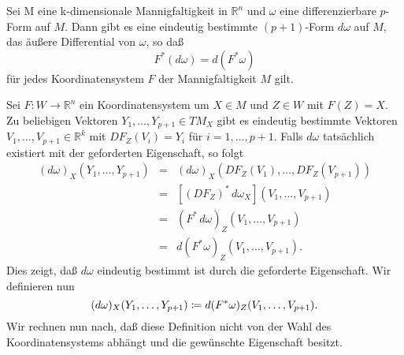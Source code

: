 \documentclass[a4paper,twoside,DIV15,BCOR12mm]{scrbook}
\begin{document}
\bigskip

\begin{satz}\label{Satz3.6.5.} {Sei M eine k-dimensionale 
Mannigfaltigkeit in ${\mathbb R}^{n}$ und $\omega$ eine 
differenzierbare $p$-Form auf $M$. Dann gibt es eine eindeutig bestimmte 
$(p+1)$-Form $d\omega$ auf $M$, das äußere Differential von $\omega$, so daß
\[ F^{*}(d\omega) = d(F^{*}\omega) \]
für jedes Koordinatensystem $F$ der Mannigfaltigkeit $M$ gilt.}
\end{satz}

\bigskip

 Sei $F: W \to {\mathbb R}^{n}$ ein 
Koordinatensystem um $X \in M$ und $Z \in W$ mit $F(Z) = X$. Zu 
beliebigen Vektoren $Y_{1},\dots,Y_{p+1} \in TM_{X}$ gibt es eindeutig 
bestimmte Vektoren $V_{1},\dots,V_{p+1} \in {\mathbb R}^{k}$ mit 
$DF_{Z}(V_{i}) = Y_{i}$ für $i = 1,\dots,p+1$. Falls $d\omega$ 
tatsächlich existiert mit der geforderten Eigenschaft, so folgt
\begin{eqnarray*}
(d\omega)_{X}(Y_{1},\dots,Y_{p+1}) & = & 
(d\omega)_{X}(DF_{Z}(V_{1}),\dots,DF_{Z}(V_{p+1})) \\
& = & \left[ (DF_{Z})^{*} \, d\omega_{X}\right] (V_{1},\dots,V_{p+1}) 
\\
& = & (F^{*}\, d\omega)_{Z}(V_{1},\dots,V_{p+1}) \\
& = & d(F^{*}\omega)_{Z} (V_{1},\dots,V_{p+1}). 
\end{eqnarray*}
Dies zeigt, daß $d\omega$ eindeutig bestimmt ist durch die 
geforderte Eigenschaft. Wir definieren nun
\[ (d\omega)_{X}(Y_{1},\dots,Y_{p+1}) \da  
d(F^{*}\omega)_{Z}(V_{1},\dots,V_{p+1}). \]
Wir  rechnen nun nach, daß diese Definition nicht von der Wahl 
des Koordinatensystems abhängt und die gewünschte Eigenschaft 
besitzt.\\
\end{document}
